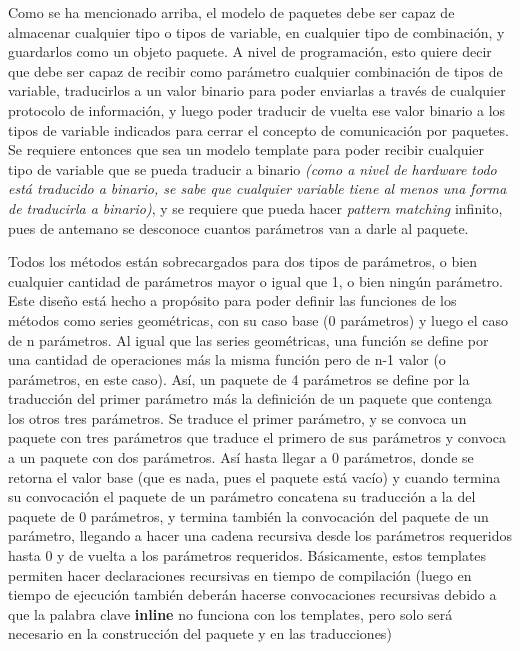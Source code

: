 \documentclass{report}
\begin{document}
\par \vspace{0.3 cm}
Como se ha mencionado arriba, el modelo de paquetes debe ser capaz de almacenar cualquier tipo o tipos de variable, en cualquier tipo de combinación, y guardarlos como un objeto paquete. A nivel de programación, esto quiere decir que debe ser capaz de recibir como parámetro cualquier combinación de tipos de variable, traducirlos a un valor binario para poder enviarlas a través de cualquier protocolo de información, y luego poder traducir de vuelta ese valor binario a los tipos de variable indicados para cerrar el concepto de comunicación por paquetes. Se requiere entonces que sea un modelo template para poder recibir cualquier tipo de variable que se pueda traducir a binario \textit{(como a nivel de hardware todo está traducido a binario, se sabe que cualquier variable tiene al menos una forma de traducirla a binario)}, y se requiere que pueda hacer \textit{pattern matching} infinito, pues de antemano se desconoce cuantos parámetros van a darle al paquete. \par \vspace{0.3 cm}
Todos los métodos están sobrecargados para dos tipos de parámetros, o bien cualquier cantidad de parámetros mayor o igual que 1, o bien ningún parámetro. Este diseño está hecho a propósito para poder definir las funciones de los métodos como series geométricas, con su caso base (0 parámetros) y luego el caso de n parámetros. Al igual que las series geométricas, una función se define por una cantidad de operaciones más la misma función pero de n-1 valor (o parámetros, en este caso). Así, un paquete de 4 parámetros se define por la traducción del primer parámetro más la definición de un paquete que contenga los otros tres parámetros. Se traduce el primer parámetro, y se convoca un paquete con tres parámetros que traduce el primero de sus parámetros y convoca a un paquete con dos parámetros. Así hasta llegar a 0 parámetros, donde se retorna el valor base (que es nada, pues el paquete está vacío) y cuando termina su convocación el paquete de un parámetro concatena su traducción a la del paquete de 0 parámetros, y termina también la convocación del paquete de un parámetro, llegando a hacer una cadena recursiva desde los parámetros requeridos hasta 0 y de vuelta a los parámetros requeridos. Básicamente, estos templates permiten hacer declaraciones recursivas en tiempo de compilación (luego en tiempo de ejecución también deberán hacerse convocaciones recursivas debido a que la palabra clave \textbf{inline} no funciona con los templates, pero solo será necesario en la construcción del paquete y en las traducciones)
\end{document}
